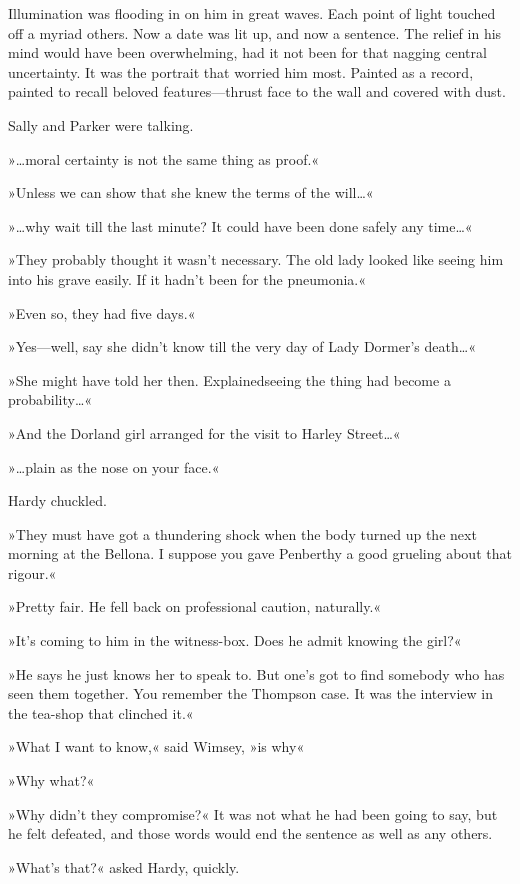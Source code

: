 Illumination was flooding in on him in great waves. Each point of light touched off a myriad others. Now a date was lit up, and now a sentence. The relief in his mind would have been overwhelming, had it not been for that nagging central uncertainty. It was the portrait that worried him most. Painted as a record, painted to recall beloved features—thrust face to the wall and covered with dust.

Sally and Parker were talking.

»\dots moral certainty is not the same thing as proof.«

»Unless we can show that she knew the terms of the will\dots«

»\dots why wait till the last minute? It could have been done safely any time\dots«

»They probably thought it wasn't necessary. The old lady looked like seeing him into his grave easily. If it hadn't been for the pneumonia.«

»Even so, they had five days.«

»Yes—well, say she didn't know till the very day of Lady Dormer's death\dots«

»She might have told her then. Explained\textellipsis  seeing the thing had become a probability\dots«

»And the Dorland girl arranged for the visit to Harley Street\dots«

»\dots plain as the nose on your face.«

Hardy chuckled.

»They must have got a thundering shock when the body turned up the next morning at the Bellona. I suppose you gave Penberthy a good grueling about that rigour.«

»Pretty fair. He fell back on professional caution, naturally.«

»It's coming to him in the witness-box. Does he admit knowing the girl?«

»He says he just knows her to speak to. But one's got to find somebody who has seen them together. You remember the Thompson case. It was the interview in the tea-shop that clinched it.«

»What I want to know,« said Wimsey, »is why\longdash«

»Why what?«

»Why didn't they compromise?« It was not what he had been going to say, but he felt defeated, and those words would end the sentence as well as any others.

»What's that?« asked Hardy, quickly.

